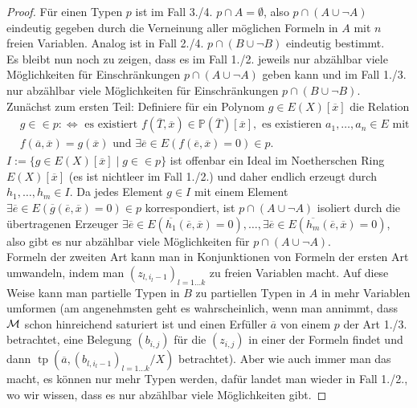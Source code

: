 \begin{proof}
	Für einen Typen $p$ ist im Fall 3./4. $p\cap A=\emptyset$, also $p\cap(A\cup\neg A)$ eindeutig gegeben durch die Verneinung aller möglichen Formeln in $A$ mit $n$ freien Variablen. Analog ist in Fall 2./4. $p\cap(B\cup\neg B)$ eindeutig bestimmt.\\
	Es bleibt nun noch zu zeigen, dass es im Fall 1./2. jeweils nur abzählbar viele Möglichkeiten für Einschränkungen $p\cap(A\cup\neg A)$ geben kann und im Fall 1./3. nur abzählbar viele Möglichkeiten für Einschränkungen $p\cap(B\cup\neg B)$.\\
	Zunächst zum ersten Teil: Definiere für ein Polynom $g\in E(X)[\overline{x}]$ die Relation
	\begin{align*}&g\in\in p:\Leftrightarrow\text{ es existiert }f(\overline{T},\overline{x})\in\mathbb{P}(\overline{T})[\overline{x}],\text{ es existieren }a_1,\dots,a_n\in E\text{ mit }\\
	&f(\overline{a},\overline{x})=g(\overline{x})\text{ und }\exists\overline{e}\in E(f(\overline{e},\overline{x})=0)\in p.
	\end{align*}
	$I:=\{g\in E(X)[\overline{x}]\mid g\in\in p\}$ ist offenbar ein Ideal im Noetherschen Ring $E(X)[\overline{x}]$ (es ist nichtleer im Fall 1./2.) und daher endlich erzeugt durch $h_1,\dots,h_m\in I$. Da jedes Element $g\in I$ mit einem Element $\exists\overline{e}\in E(\overline{g}(\overline{e},\overline{x})=0)\in p$ korrespondiert, ist $p\cap(A\cup\neg A)$ isoliert durch die übertragenen Erzeuger $\exists\overline{e}\in E(\overline{h_1}(\overline{e},\overline{x})=0),\dots,\exists\overline{e}\in E(\overline{h_m}(\overline{e},\overline{x})=0)$, also gibt es nur abzählbar viele Möglichkeiten für $p\cap(A\cup\neg A)$.\\
	Formeln der zweiten Art kann man in Konjunktionen von Formeln der ersten Art umwandeln, indem man $(z_{l,i_l-1})_{l=1\dots k}$ zu freien Variablen macht. Auf diese Weise kann man partielle Typen in $B$ zu partiellen Typen in $A$ in mehr Variablen umformen (am angenehmsten geht es wahrscheinlich, wenn man annimmt, dass $\mathcal{M}$ schon hinreichend saturiert ist und einen Erfüller $\overline{a}$ von einem $p$ der Art 1./3. betrachtet, eine Belegung $(b_{i,j})$ für die $(z_{i,j})$ in einer der Formeln findet und dann $\operatorname{tp}(\overline{a},(b_{l,i_l-1})_{l=1\dots k}/X)$ betrachtet). Aber wie auch immer man das macht, es können nur mehr Typen werden, dafür landet man wieder in Fall 1./2., wo wir wissen, dass es nur abzählbar viele Möglichkeiten gibt.
\end{proof}